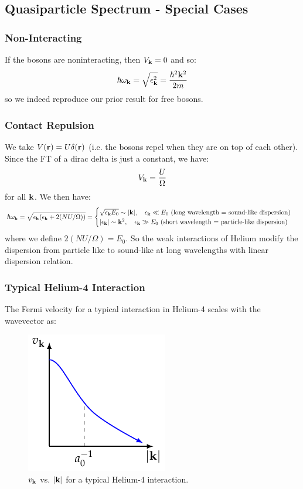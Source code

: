 \subsection{Quasiparticle Spectrum - Special Cases}
\subsubsection{Non-Interacting}
If the bosons are noninteracting, then $V_{\mathbf{k}} = 0$ and so:
\begin{align*}
    \hbar\omega_{\mathbf{k}} = \sqrt{\epsilon_{\mathbf{k}}^2} = \frac{\hbar^2\mathbf{k}^2}{2m}
\end{align*}
so we indeed reproduce our prior result for free bosons.

\subsubsection{Contact Repulsion}
We take $V(\mathbf{r}) = U\delta(\mathbf{r})$ (i.e. the bosons repel when they are on top of each other). Since the FT of a dirac delta is just a constant, we have:
\begin{align*}
    V_{\mathbf{k}} = \frac{U}{\Omega}
\end{align*}
for all $\mathbf{k}$. We then have:
\begin{equation}
    \hbar\omega_{\mathbf{k}} = \sqrt{\epsilon_{\mathbf{k}}(\epsilon_{\mathbf{k}} + 2(NU/\Omega))} = \begin{cases}
        \sqrt{\epsilon_{\mathbf{k}}E_0} \sim \lvert \mathbf{k} \rvert, \quad \epsilon_{\mathbf{k}} \ll E_0 \text{ (long wavelength = sound-like dispersion)}
        \\ \lvert \epsilon_{\mathbf{k}} \rvert \sim \mathbf{k}^2, \quad \epsilon_{\mathbf{k}} \gg E_0 \text{ (short wavelength = particle-like dispersion)}
    \end{cases}
\end{equation}
where we define $2(NU/\Omega) = E_0$. So the weak interactions of Helium modify the dispersion from particle like to sound-like at long wavelengths with linear dispersion relation.

\subsubsection{Typical Helium-4 Interaction}
The Fermi velocity for a typical interaction in Helium-4 scales with the wavevector as:
\begin{figure}[htbp]
    \centering
    \includegraphics[]{Images/fig-Hevelocity.pdf}

    \caption{$v_{\mathbf{k}}$ vs. $\lvert \mathbf{k} \rvert$ for a typical Helium-4 interaction.}
    \label{fig-Hevelocity}
\end{figure}

